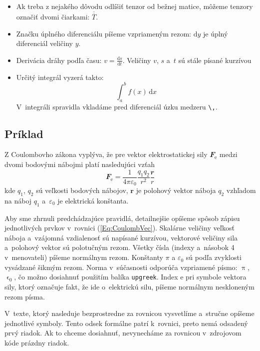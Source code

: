 \begin{itemize}
    \item Ak treba z nejakého dôvodu odlíšiť tenzor
    od bežnej matice, môžeme tenzory označiť dvomi čiarkami:
    $\overline{\overline T}$.

    \item Značku úplného diferenciálu píšeme vzpriameným rezom:
    $\mathrm dy$ je úplný diferenciál veličiny $y$.

    \item Derivácia dráhy podľa času:
    $v = \frac{\mathrm ds}{\mathrm dt}$.
    Veličiny $v$, $s$ a~$t$ sú stále písané kurzívou

    \item Určitý integrál vyzerá takto:
    $$
    \int_a^b f(x)\,\mathrm dx
    $$
    V~integráli spravidla vkladáme pred diferenciál
    úzku medzeru \verb|\,|.
\end{itemize}

\subsection*{\normalsize Príklad}
Z Coulombovho zákona vyplýva,
že pre vektor elektrostatickej sily $\mathbfit F_\mathrm e$
medzi dvomi bodovými nábojmi platí nasledujúci vzťah
\begin{equation}\label{Eq:CoulombVec}
  \mathbfit F_\mathrm e = \frac1{4\pi\varepsilon_0}
  \frac{q_1q_2}{r^2}\frac{\mathbfit r}r
\end{equation}
kde $q_1$, $q_2$ sú veľkosti bodových nábojov,
$\mathbf r$ je polohový vektor náboja $q_2$
vzhľadom na náboj $q_1$
a~$\varepsilon_0$ je elektrická konštanta.

Aby sme zhrnuli predchádzajúce pravidlá, detailnejšie opíšeme spôsob zápisu jednotlivých prvkov
v~rovnici (\ref{Eq:CoulombVec}).
Skalárne veličiny veľkosť náboja a~vzájomná vzdialenosť sú
napísané kurzívou,
vektorové veličiny sila a~polohový vektor sú polotučným rezom.
Všetky čísla (indexy a~násobok 4 v~menovateli)
píšeme normálnym rezom.
Konštanty $\pi$ a $\varepsilon_0$ sú podľa zvyklosti vysádzané
šikmým rezom.
Norma v~súčasnosti odporúča vzpriamené písmo:
$\uppi$, $\upvarepsilon_0$, čo možno dosiahnuť použitím balíka
\verb|upgreek|.
Index $\mathrm e$ pri symbole vektora sily,
ktorý označuje fakt, že ide o~elektrickú silu,
píšeme normálnym neskloneným rezom písma.

V~texte, ktorý nasleduje bezprostredne za rovnicou vysvetlíme
a~stručne opíšeme jednotlivé symboly.
Tento odsek formálne patrí k~rovnici,
preto nemá odsadený prvý riadok.
Ak to chceme dosiahnuť,
nevynecháme za rovnicou v~zdrojovom kóde
prázdny riadok.

